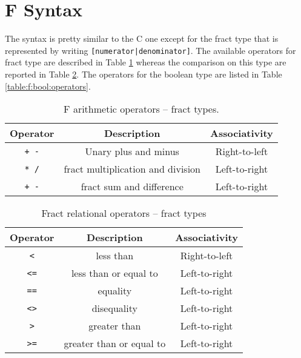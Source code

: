 \section{F Syntax}
The syntax is pretty similar to the C one except for the fract type that
is represented by writing \verb![numerator|denominator]!.
The available operators for fract type are described in Table
\ref{table:f:fract:operators} whereas the comparison on this type are reported
in Table \ref{table:f:fract:comparison:operators}.
The operators for the boolean type are listed in Table 
\ref{table:f:bool:operators}.



\begin{table}[h]
\centering
\begin{tabular}{|c|c|c|}
\hline
\textbf{Operator} & \textbf{Description} & \textbf{Associativity} \\ 
\hline
\verb|+ -| & Unary plus and minus 	& Right-to-left	\\
\verb|* /| & fract multiplication and division & Left-to-right \\ 
\verb|+ -| & fract sum and difference & Left-to-right \\
\hline
\end{tabular}
\caption{F arithmetic operators -- fract types.}
\label{table:f:fract:operators}


\end{table}

\begin{table}[h]
\centering
\begin{tabular}{|c|c|c|}
\hline
\textbf{Operator} & \textbf{Description} & \textbf{Associativity} \\ 
\hline
\verb|<|	& less than	& Right-to-left	\\
\verb|<=|	& less than or equal to	& Left-to-right \\ 
\verb|==|	& equality & Left-to-right \\
\verb|<>|	& disequality & Left-to-right \\
\verb|>|	& greater than & Left-to-right\\
\verb|>=|	& greater than or equal to & Left-to-right \\
\hline
\end{tabular}
\caption{Fract relational operators -- fract types}
\label{table:f:fract:comparison:operators}
\end{table}


